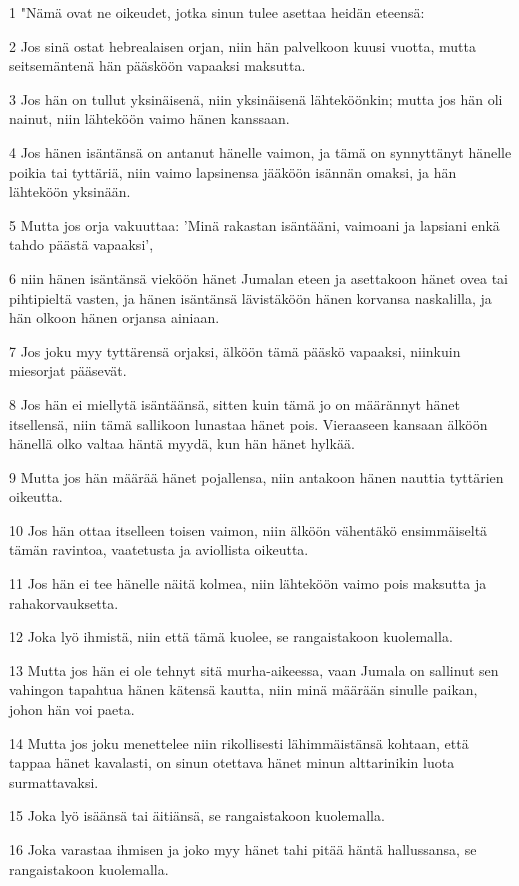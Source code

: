 \par 1 "Nämä ovat ne oikeudet, jotka sinun tulee asettaa heidän eteensä:
\par 2 Jos sinä ostat hebrealaisen orjan, niin hän palvelkoon kuusi vuotta, mutta seitsemäntenä hän pääsköön vapaaksi maksutta.
\par 3 Jos hän on tullut yksinäisenä, niin yksinäisenä lähteköönkin; mutta jos hän oli nainut, niin lähteköön vaimo hänen kanssaan.
\par 4 Jos hänen isäntänsä on antanut hänelle vaimon, ja tämä on synnyttänyt hänelle poikia tai tyttäriä, niin vaimo lapsinensa jääköön isännän omaksi, ja hän lähteköön yksinään.
\par 5 Mutta jos orja vakuuttaa: 'Minä rakastan isäntääni, vaimoani ja lapsiani enkä tahdo päästä vapaaksi',
\par 6 niin hänen isäntänsä vieköön hänet Jumalan eteen ja asettakoon hänet ovea tai pihtipieltä vasten, ja hänen isäntänsä lävistäköön hänen korvansa naskalilla, ja hän olkoon hänen orjansa ainiaan.
\par 7 Jos joku myy tyttärensä orjaksi, älköön tämä pääskö vapaaksi, niinkuin miesorjat pääsevät.
\par 8 Jos hän ei miellytä isäntäänsä, sitten kuin tämä jo on määrännyt hänet itsellensä, niin tämä sallikoon lunastaa hänet pois. Vieraaseen kansaan älköön hänellä olko valtaa häntä myydä, kun hän hänet hylkää.
\par 9 Mutta jos hän määrää hänet pojallensa, niin antakoon hänen nauttia tyttärien oikeutta.
\par 10 Jos hän ottaa itselleen toisen vaimon, niin älköön vähentäkö ensimmäiseltä tämän ravintoa, vaatetusta ja aviollista oikeutta.
\par 11 Jos hän ei tee hänelle näitä kolmea, niin lähteköön vaimo pois maksutta ja rahakorvauksetta.
\par 12 Joka lyö ihmistä, niin että tämä kuolee, se rangaistakoon kuolemalla.
\par 13 Mutta jos hän ei ole tehnyt sitä murha-aikeessa, vaan Jumala on sallinut sen vahingon tapahtua hänen kätensä kautta, niin minä määrään sinulle paikan, johon hän voi paeta.
\par 14 Mutta jos joku menettelee niin rikollisesti lähimmäistänsä kohtaan, että tappaa hänet kavalasti, on sinun otettava hänet minun alttarinikin luota surmattavaksi.
\par 15 Joka lyö isäänsä tai äitiänsä, se rangaistakoon kuolemalla.
\par 16 Joka varastaa ihmisen ja joko myy hänet tahi pitää häntä hallussansa, se rangaistakoon kuolemalla.
